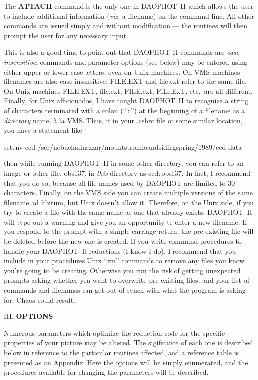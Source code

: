 The {\bf ATTACH} command is the only one in DAOPHOT~II which allows the
user to include additional information ({\it viz}. a filename) on the
command line. All other commands are issued simply and without
modification --- the routines will then prompt the user for any
necessary input.

This is also a good time to point out that DAOPHOT~II commands are {\it
case insensitive\/}:  commands and parameter options (see below) may be
entered using either upper or lower case letters, even on Unix
machines.  On VMS machines filenames are also case insensitive:
FILE.EXT and file.ext refer to the same file.  On Unix machines
FILE.EXT, file.ext, FILE.ext, FiLe.ExT, etc.\ are all different.
Finally, for Unix afficionados, I have taught DAOPHOT~II to recognize a
string of characters terminated with a colon (``$\,$:$\,$'') at the
beginning of a filename as a {\it directory\/} name, \`a la VMS.  Thus,
if in your .cshrc file or some similar location, you have a statement
like

\medskip
\noindent setenv ccd
/scr/nebuchadnezzar/mountstromloandsidingspring/1989/ccd-data
\medskip

\noindent then while running DAOPHOT~II in some other directory, you
can refer to an image or other file, obs137, in {\it this\/} directory
as ccd:$\,$obs137.  In fact, I recommend that you do so, because all
file names used by DAOPHOT are limited to 30 characters.  Finally, on
the VMS side you can create multiple versions of the same filename ad
libitum, but Unix doesn't allow it.  Therefore, on the Unix side, if
you try to create a file with the same name as one that already exists,
DAOPHOT~II will type out a warning and give you an opportunity to enter
a new filename.  If you respond to the prompt with a simple carriage
return, the pre-existing file will be deleted before the new one is
created.  If you write command procedures to handle your DAOPHOT~II
reductions (I know I do), I recommend that you include in your
procedures Unix ``rm'' commands to remove any files you know you're
going to be creating.  Otherwise you run the risk of getting unexpected
prompts asking whether you want to overwrite pre-existing files, and
your list of commands and filenames can get out of synch with what the
program is asking for.  Chaos could result.

\vfill
\eject
\noindent III.  {\bf OPTIONS}

Numerous parameters which optimize the reduction code for the specific
properties of your picture may be altered.  The sigificance of each one
is described below in reference to the particular routines affected, and
a reference table is presented as an Appendix.  Here the options will
be simply enumerated, and the procedures available for changing the
parameters will be described.

